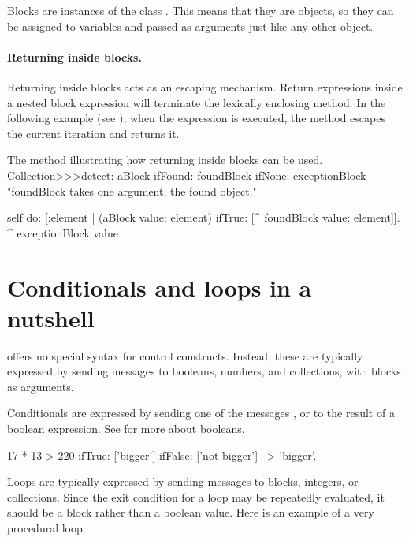 \documentclass[a4paper,10pt,twoside]{book}
\begin{document}
Blocks are instances of the class .
This means that they are objects, so they can be assigned to variables and passed as arguments just like any other object.

\paragraph{Returning inside blocks.}
Returning inside blocks acts as an escaping mechanism.
Return expressions inside a nested block expression will terminate the lexically enclosing method.
In the following example (see ), when the expression  is executed, the method  escapes the current iteration and returns it.

\begin{method}[detectReturnBlock]{The method  illustrating how returning inside blocks can be used.}
Collection>>>detect: aBlock ifFound: foundBlock ifNone: exceptionBlock
   "foundBlock takes one argument, the found object."

   self do: [:element |
      (aBlock value: element) ifTrue: [^ foundBlock value: element]].
   ^ exceptionBlock value
\end{method}


\section{Conditionals and loops in a nutshell}

\st offers no special syntax for control constructs.
Instead, these are typically expressed by sending messages to booleans, numbers, and collections, with blocks as arguments.

Conditionals are expressed by sending one of the messages ,  or  to the result of a boolean expression.
See  for more about booleans.

\begin{code}{}
17 * 13 > 220
   ifTrue: ['bigger']
   ifFalse: ['not bigger'] --> 'bigger'.
\end{code}

Loops are typically expressed by sending messages to blocks, integers, or collections.
Since the exit condition for a loop may be repeatedly evaluated, it should be a block rather than a boolean value.
Here is an example of a very procedural loop:
\end{document}
